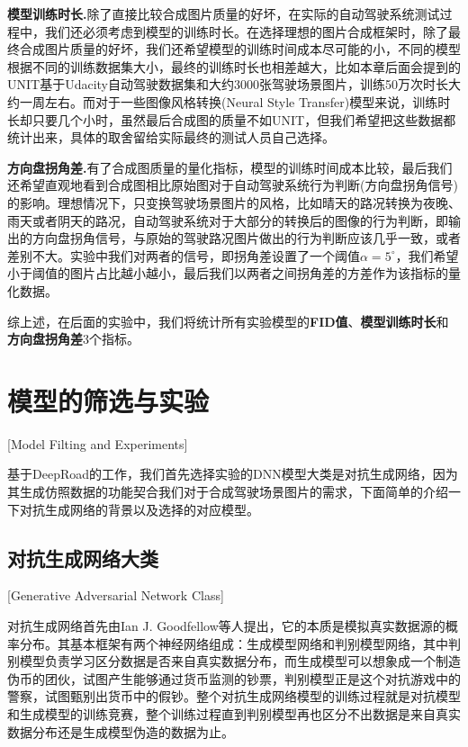 \textbf{模型训练时长.}\quad 除了直接比较合成图片质量的好坏，在实际的自动驾驶系统测试过程中，我们还必须考虑到模型的训练时长。在选择理想的图片合成框架时，除了最终合成图片质量的好坏，我们还希望模型的训练时间成本尽可能的小，不同的模型根据不同的训练数据集大小，最终的训练时长也相差越大，比如本章后面会提到的UNIT\cite{UNIT}基于Udacity自动驾驶数据集\cite{udacity_dataset}和大约3000张驾驶场景图片，训练50万次时长大约一周左右。而对于一些图像风格转换(Neural Style Transfer)模型来说，训练时长却只要几个小时，虽然最后合成图的质量不如UNIT，但我们希望把这些数据都统计出来，具体的取舍留给实际最终的测试人员自己选择。 

\textbf{方向盘拐角差.}\quad 有了合成图质量的量化指标，模型的训练时间成本比较，最后我们还希望直观地看到合成图相比原始图对于自动驾驶系统行为判断(方向盘拐角信号)的影响。理想情况下，只变换驾驶场景图片的风格，比如晴天的路况转换为夜晚、雨天或者阴天的路况，自动驾驶系统对于大部分的转换后的图像的行为判断，即输出的方向盘拐角信号，与原始的驾驶路况图片做出的行为判断应该几乎一致，或者差别不大。实验中我们对两者的信号，即拐角差设置了一个阈值$\alpha=5^{\circ}$，我们希望小于阈值的图片占比越小越小，最后我们以两者之间拐角差的方差作为该指标的量化数据。

综上述，在后面的实验中，我们将统计所有实验模型的\textbf{FID值}、\textbf{模型训练时长}和\textbf{方向盘拐角差}3个指标。


\section{模型的筛选与实验}[Model Filting and Experiments]

基于DeepRoad的工作，我们首先选择实验的DNN模型大类是对抗生成网络\cite{GAN}，因为其生成仿照数据的功能契合我们对于合成驾驶场景图片的需求，下面简单的介绍一下对抗生成网络的背景以及选择的对应模型。

\subsection{对抗生成网络大类}[Generative Adversarial Network Class]

对抗生成网络\cite{GAN}首先由Ian J. Goodfellow等人提出，它的本质是模拟真实数据源的概率分布。其基本框架有两个神经网络组成：生成模型网络和判别模型网络，其中判别模型负责学习区分数据是否来自真实数据分布，而生成模型可以想象成一个制造伪币的团伙，试图产生能够通过货币监测的钞票，判别模型正是这个对抗游戏中的警察，试图甄别出货币中的假钞。整个对抗生成网络模型的训练过程就是对抗模型和生成模型的训练竞赛，整个训练过程直到判别模型再也区分不出数据是来自真实数据分布还是生成模型伪造的数据为止。

